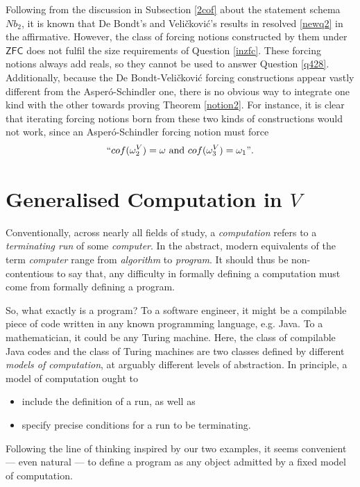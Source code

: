 \documentclass[12pt, twoside]{memoir}
\numberwithin{equation}{section}
\theoremstyle{definition}
\theoremstyle{remark}
\theoremstyle{definition}
\theoremstyle{definition}
\theoremstyle{definition}
\theoremstyle{remark}
\begin{document}
Following from the discussion in Subsection \ref{2cof} about the statement schema $Nb_2$, it is known that De Bondt's and Veli\v{c}kovi\'{c}'s results in \cite{bendb} resolved \ref{newq2} in the affirmative. However, the class of forcing notions constructed by them under $\mathsf{ZFC}$ does not fulfil the size requirements of Question \ref{inzfc}. These forcing notions always add reals, so they cannot be used to answer Question \ref{q428}. Additionally, because the De Bondt-Veli\v{c}kovi\'{c} forcing constructions appear vastly different from the Asper\'{o}-Schindler one, there is no obvious way to integrate one kind with the other towards proving Theorem \ref{notion2}. For instance, it is clear that iterating forcing notions born from these two kinds of constructions would not work, since an Asper\'{o}-Schindler forcing notion must force 
\begin{equation*}
    ``cof(\omega_2^V) = \omega \text{ and } cof(\omega_3^V) = \omega_1" \text{.}
\end{equation*}

\chapter{Generalised Computation in \texorpdfstring{$V$}{V}}\label{chap6}

Conventionally, across nearly all fields of study, a \textit{computation} refers to a \textit{terminating run} of some \textit{computer}. In the abstract, modern equivalents of the term \textit{computer} range from \textit{algorithm} to \textit{program}. It should thus be non-contentious to say that, any difficulty in formally defining a computation must come from formally defining a program.

So, what exactly is a program? To a software engineer, it might be a compilable piece of code written in any known programming language, e.g. Java. To a mathematician, it could be any Turing machine. Here, the class of compilable Java codes and the class of Turing machines are two classes defined by different \textit{models of computation}, at arguably different levels of abstraction. In principle, a model of computation ought to 
\begin{itemize}
    \item include the definition of a run, as well as
    \item specify precise conditions for a run to be terminating.
\end{itemize} 
Following the line of thinking inspired by our two examples, it seems convenient --- even natural --- to define a program as any object admitted by a fixed model of computation. 
\end{document}
